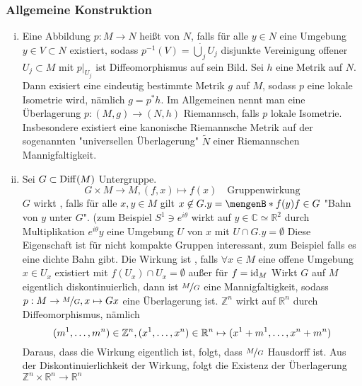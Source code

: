 \subsubsection{Allgemeine Konstruktion}
\label{ssub:24}
\begin{enumerate}[(i)]
\item Eine Abbildung $p:M\to N$ heißt  von $N$, falls für alle $y\in N$ eine Umgebung $y\in V\subset N$ existiert, sodass $p^{-1}(V) = \dot{\bigcup}_j U_j$ disjunkte Vereinigung offener $U_j \subset M$ mit $p\vert_{U_j}$ ist Diffeomorphismus auf sein Bild.
Sei $h$ eine Metrik auf $N$. Dann exisiert eine eindeutig bestimmte Metrik $g$ auf $M$, sodass $p$ eine lokale Isometrie wird, nämlich $g = p^* h$. Im Allgemeinen nennt man eine Überlagerung $p:(M,g)\to (N,h)$ Riemannsch, falls $p$ lokale Isometrie. Insbesondere existiert eine kanonische Riemannsche Metrik auf der sogenannten "universellen Überlagerung" $\tilde{N}$ einer Riemannschen Mannigfaltigkeit. 
\item Sei $G\subset \operatorname{Diff}(M)$ Untergruppe.
\[
G\times M\to M, (f,x)\mapsto f(x)\quad \text{Gruppenwirkung}
\]
$G$ wirkt , falls für alle $x,y \in M$ gilt $x\not\in G.y = \set[f(y)]{f\in G}$ "Bahn von $y$ unter $G$". (zum Beispiel $S^1 \ni e^{i\theta}$ wirkt auf $y\in \mathds{C}\simeq \mathds{R}^2$ durch Multiplikation $e^{i\theta} y$
eine Umgebung $U$ von $x$ mit $U\cap G.y = \emptyset$
 Diese Eigenschaft ist für nicht kompakte Gruppen interessant, zum Beispiel falls es eine dichte Bahn gibt.
Die Wirkung ist , falls $\forall x\in M$ eine offene Umgebung $x\in U_x$ existiert mit $f(U_x)\cap U_x = \emptyset$ außer für $f = \operatorname{id}_M$
Wirkt $G$ auf $M$ eigentlich diskontinuierlich, dann ist $\nicefrac{M}{G}$ eine Mannigfaltigkeit, sodass $p:M\to \nicefrac{M}{G}, x\mapsto Gx$ eine Überlagerung ist.
$\mathds{Z}^n$ wirkt auf $\mathds{R}^n$ durch Diffeomorphismus, nämlich
\[
(m^1,\ldots,m^n)\in \mathbb{Z}^n, (x^1,\ldots,x^n)\in \mathbb{R}^n \mapsto (x^1+m^1,\ldots,x^n+m^n)
\]
Daraus, dass die Wirkung eigentlich ist, folgt, dass $\nicefrac{M}{G}$ Hausdorff ist.
Aus der Diskontinuierlichkeit der Wirkung, folgt die Existenz der Überlagerung $\mathds{Z}^n \times \mathds{R}^n \to \mathds{R}^n$
\end{enumerate}

